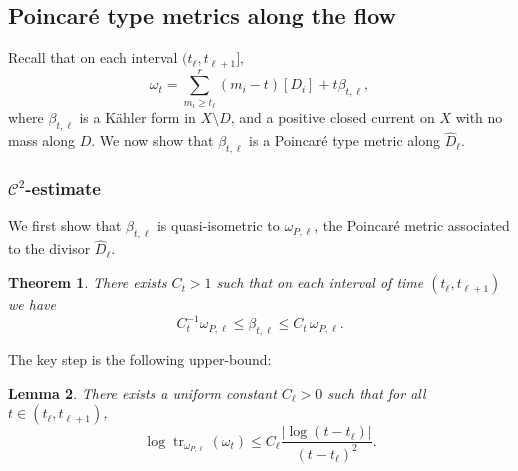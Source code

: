 \documentclass[10pt,a4paper]{amsart}
\numberwithin{equation}{section}
\newtheorem{theorem}{Theorem}[section]
\newtheorem{lem}[theorem]{Lemma}
\newcommand{\tr}{\operatorname{tr}}
\begin{document}
\subsection{Poincaré type metrics along the flow}

   Recall that on each interval $(t_\ell, t_{\ell+1}]$,
   $$
\omega_t=\sum_{m_i\geq t_\ell}^r (m_i-t) [D_i]+t \beta_{t, \ell},
$$
 where $\beta_{t, \ell}$ is a  K\"ahler form in  $X \setminus D$, and
  a positive closed current on $X$ with no mass along  $D$.
 We now show   that $\beta_{t, \ell}$ is a Poincaré type metric along $\hat{D}_\ell$.
   
  
  
  
  \subsubsection{${\mathcal C}^2$-estimate}
   
   We first show that $\beta_{t, \ell}$ is quasi-isometric to $\omega_{P, \ell}$, 
   the Poincar\'e metric associated to the divisor $\hat{D}_\ell$.
 
 \begin{theorem} \label{thm:c2hyp}
	 There exists $C_t>1$ such that on each interval of time $(t_\ell, t_{\ell+1})$ we have   
	 $$
	 C_t^{-1} \omega_{P,\ell} \leq \beta_{t,\ell} \leq C_t \, \omega_{P, \ell}.
	 $$
\end{theorem}

The key step 
is the following upper-bound:


\begin{lem} \label{lem:c2baby}
There exists a uniform constant $C_{\ell}>0$ such that for all $t\in (t_\ell, t_{\ell+1})$,
\[
\log \tr_{\omega_{P,\ell}} (\omega_{t}) \leq C_{\ell} \frac{|\log (t-t_{\ell})|}{(t-t_{\ell})^2}.
\]
\end{lem}
\end{document}
